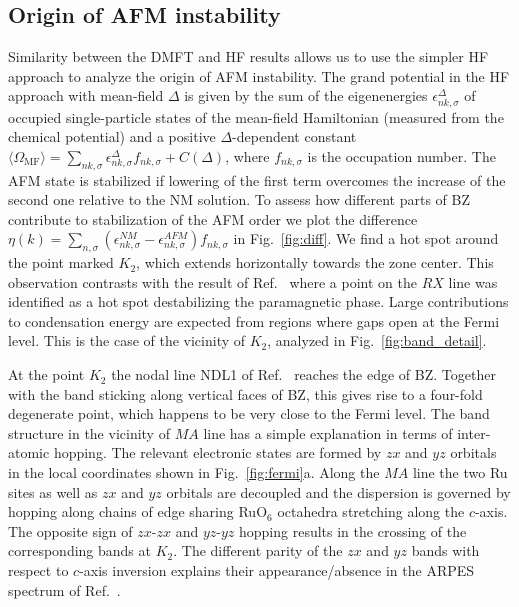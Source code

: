 \documentclass[reprint,twocolumn,superscriptaddress,secnumarabic,amssymb, nobibnotes, aps, prb]{revtex4-1}
\begin{document}
\subsection{Origin of AFM instability} 
Similarity between the DMFT and HF results allows us to use
the simpler HF approach to analyze the origin of AFM instability.
The grand potential in the HF approach with mean-field $\Delta$ is given by the sum 
of the eigenenergies $\epsilon_{{nk,\sigma}}^\Delta$ of occupied single-particle states of the mean-field Hamiltonian (measured from the chemical potential) and 
a positive $\Delta$-dependent constant
$\langle \Omega_{\text{MF}}\rangle=\sum_{nk,\sigma}\epsilon_{{nk,\sigma}}^\Delta f_{nk,\sigma}+C(\Delta)$,
where $f_{nk,\sigma}$ is the occupation number.
The AFM state is stabilized if lowering 
of the first term overcomes the increase of the second one relative to the NM solution.
To assess how different parts of BZ contribute to stabilization 
of the AFM order we plot the difference ${\eta(k)=\sum_{n,\sigma}(\epsilon^{NM}_{nk,\sigma}-\epsilon^{AFM}_{nk,\sigma})
f_{nk,\sigma}}$ in Fig.~\ref{fig:diff}. We find a hot spot around the point marked $K_2$, which extends horizontally towards
the zone center. This observation contrasts with the result of Ref.~ where a point on the $RX$ line was identified as a hot spot destabilizing
the paramagnetic phase. Large contributions to condensation energy are expected from regions where gaps open at the Fermi level. This is the case of the vicinity of $K_2$, analyzed in Fig.~\ref{fig:band_detail}. 

At the point $K_2$ the nodal line NDL1 of Ref.~ reaches the edge of BZ. Together with the band sticking along vertical faces of BZ, this gives rise to a four-fold degenerate point, which happens to be very close to the Fermi level.
The band structure in the vicinity of $MA$ line has a simple explanation in terms of
inter-atomic hopping. The relevant electronic states are formed by $zx$ and $yz$ orbitals
in the local coordinates shown in Fig.~\ref{fig:fermi}a. Along the $MA$ line the two Ru sites as well as $zx$ and $yz$ orbitals are decoupled and the dispersion is governed by
hopping along chains of edge sharing RuO$_6$ octahedra stretching along the $c$-axis. The opposite sign of $zx$-$zx$ and $yz$-$yz$ hopping results in the crossing of the corresponding bands at $K_2$. The different parity of the $zx$ and $yz$ bands with respect to $c$-axis inversion 
explains their appearance/absence in the ARPES spectrum of Ref.~.
\end{document}
